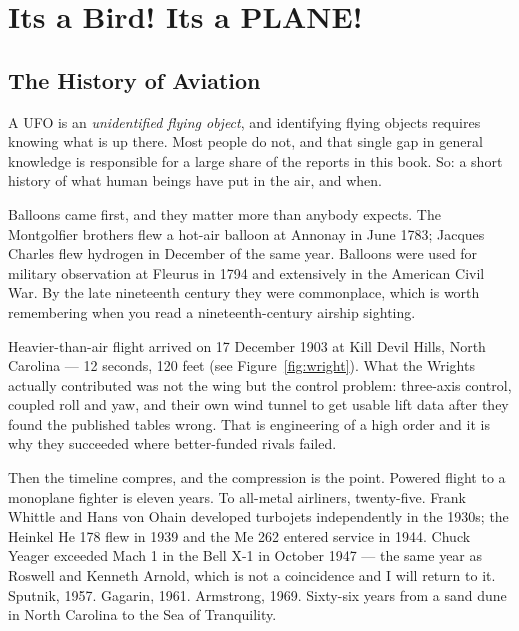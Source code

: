 \chapter{Its a Bird! Its a PLANE!}\label{ch:aviation}


\section{The History of Aviation}\label{sec:historyaviation}

A UFO is an \emph{unidentified flying object}, and identifying flying objects requires knowing
what is up there. Most people do not, and that single gap in general knowledge is responsible for
a large share of the reports in this book. So: a short history of what human beings have put in
the air, and when.

Balloons came first, and they matter more than anybody expects. The Montgolfier brothers flew a
hot-air balloon at Annonay in June 1783; Jacques Charles flew hydrogen in December of the same
year. Balloons were used for military observation at Fleurus in 1794 and extensively in the
American Civil War. By the late nineteenth century they were commonplace, which is worth
remembering when you read a nineteenth-century airship sighting.

Heavier-than-air flight arrived on 17 December 1903 at Kill Devil Hills, North Carolina --- 12
seconds, 120 feet (see Figure~\ref{fig:wright}). What the Wrights actually contributed was not the wing but the control
problem: three-axis control, coupled roll and yaw, and their own wind tunnel to get usable lift
data after they found the published tables wrong. That is engineering of a high order and it is
why they succeeded where better-funded rivals failed.

Then the timeline compres, and the compression is the point. Powered flight to a monoplane
fighter is eleven years. To all-metal airliners, twenty-five. Frank Whittle and Hans von Ohain
developed turbojets independently in the 1930s; the Heinkel He 178 flew in 1939 and the Me 262
entered service in 1944. Chuck Yeager exceeded Mach 1 in the Bell X-1 in October 1947 --- the
same year as Roswell and Kenneth Arnold, which is not a coincidence and I will return to it.
Sputnik, 1957. Gagarin, 1961. Armstrong, 1969. Sixty-six years from a sand dune in North
Carolina to the Sea of Tranquility.

